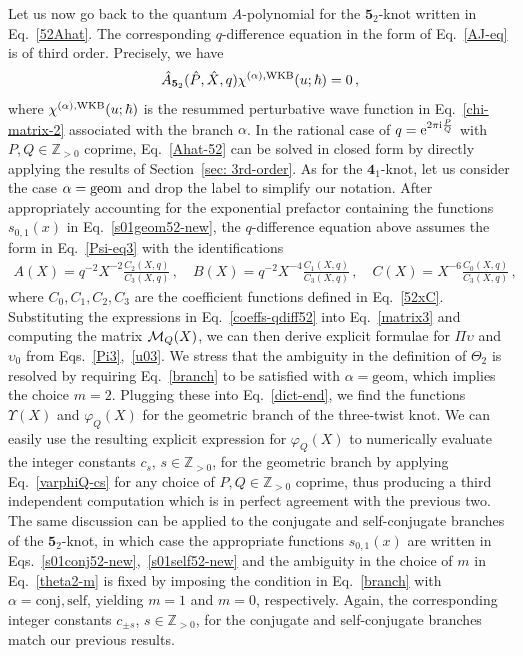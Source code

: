 \documentclass[a4paper,11pt]{article}
\theoremstyle{definition}
\newcommand{\CM}{{\cal M}}
\def\IZ{{\mathbb Z}}
\newcommand\TT{{\mathbb T}}
\def\FE{\bm{4}_1}
\def\TT{\bm{5}_2}
\def\u{\upsilon}
\newcommand{\re}{{\rm e}}
\newcommand{\ri}{{\rm i}}
\newcommand{\be}{\begin{equation}}
\newcommand{\ee}{\end{equation}}
\newcommand{\ba}{\begin{aligned}}
\newcommand{\ea}{\end{aligned}}
\begin{document}
Let us now go back to the quantum $A$-polynomial for the $\TT$-knot written in Eq.~\eqref{52Ahat}. The corresponding $q$-difference equation in the form of Eq.~\eqref{AJ-eq} is of third order. Precisely, we have 
\be \label{Ahat-52}
\hat{A}_{\TT}(\hat{P}, \hat{X}, q) \chi^{(\alpha), \rm{WKB}}(u; \hbar) = 0 \, ,
\ee
where $\chi^{(\alpha), \rm{WKB}}(u; \hbar)$ is the resummed perturbative wave function in Eq.~\eqref{chi-matrix-2} associated with the branch $\alpha$.
In the rational case of $q= \re^{2 \pi \ri {P \over Q}}$ with $P, Q \in \IZ_{>0}$ coprime, Eq.~\eqref{Ahat-52} can be solved in closed form by directly applying the results of Section~\ref{sec: 3rd-order}. 
As for the $\FE$-knot, let us consider the case $\alpha = \rm{geom}$ and drop the label to simplify our notation.
After appropriately accounting for the exponential prefactor containing the functions $s_{0,1}(x)$ in Eq.~\eqref{s01geom52-new}, the $q$-difference equation above assumes the form in Eq.~\eqref{Psi-eq3} with the identifications
 \be \label{coeffs-qdiff52}
 \ba
  A(X)= q^{-2} X^{-2} \frac{C_2(X,q)}{C_3(X,q)} \, , \quad B(X)= q^{-2} X^{-4} \frac{C_1(X,q)}{C_3(X,q)} \, , \quad C(X) = X^{-6} \frac{C_0(X,q)}{C_3(X,q)} \, ,
  \ea
 \ee
 where $C_0,C_1,C_2,C_3$ are the coefficient functions defined in Eq.~\eqref{52xC}. Substituting the expressions in Eq.~\eqref{coeffs-qdiff52} into Eq.~\eqref{matrix3} and computing the matrix $\CM_Q(X)$, we can then derive explicit formulae for $\Pi \u$ and $\u_0$ from Eqs.~\eqref{Pi3},~\eqref{u03}. We stress that the ambiguity in the definition of $\Theta_2$ is resolved by requiring Eq.~\eqref{branch} to be satisfied with $\alpha=\text{geom}$, which implies the choice $m=2$. Plugging these into Eq.~\eqref{dict-end}, we find the functions $\Upsilon (X)$ and $\varphi_Q(X)$ for the geometric branch of the three-twist knot. We can easily use the resulting explicit expression for $\varphi_Q(X)$ to numerically evaluate the integer constants $c_s$, $s \in \IZ_{>0}$, for the geometric branch by applying Eq.~\eqref{varphiQ-cs} for any choice of $P, Q \in \IZ_{>0}$ coprime, thus producing a third independent computation which is in perfect agreement with the previous two. The same discussion can be applied to the conjugate and self-conjugate branches of the $\TT$-knot, in which case the appropriate functions $s_{0,1}(x)$ are written in Eqs.~\eqref{s01conj52-new},~\eqref{s01self52-new} and the ambiguity in the choice of $m$ in Eq.~\eqref{theta2-m} is fixed by imposing the condition in Eq.~\eqref{branch} with $\alpha = \text{conj}, \text{self}$, yielding $m=1$ and $m=0$, respectively. Again, the corresponding integer constants $c_{\pm s}$, $s \in \IZ_{>0}$, for the conjugate and self-conjugate branches match our previous results.
\end{document}
